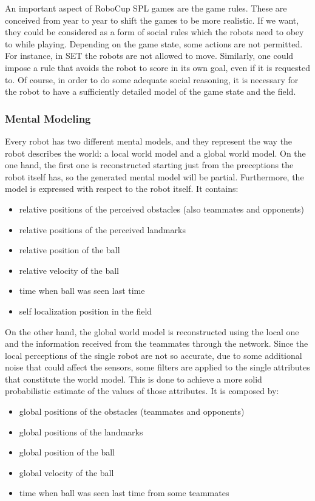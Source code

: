 \documentclass[a4paper, onecolumn, 12pt]{article}
\begin{document}
An important aspect of RoboCup SPL games are the game rules. These are conceived
from year to year to shift the games to be more realistic. If we want, they
could be considered as a form of social rules which the robots need to obey to
while playing. Depending on the game state, some actions are not permitted. For
instance, in SET the robots are not allowed to move. Similarly, one could impose
a rule that avoids the robot to score in its own goal, even if it is requested
to. Of course, in order to do some adequate social reasoning, it is necessary
for the robot to have a sufficiently detailed model of the game state and the
field.

\subsubsection{Mental Modeling}
\label{subsec:mental_model}
Every robot has two different mental models, and they represent the way the robot 
describes the world: a local world model and a global world model.
On the one hand, the first one is reconstructed starting just from the preceptions the robot itself has,
so the generated mental model will be partial. Furthermore, the model is expressed 
with respect to the robot itself.
It contains:
\begin{itemize}
    \item relative positions of the perceived obstacles (also teammates and opponents)
    \item relative positions of the perceived landmarks
    \item relative position of the ball
    \item relative velocity of the ball
    \item time when ball was seen last time
    \item self localization position in the field
\end{itemize}

On the other hand, the global world model is reconstructed using the local one and the information
received from the teammates through the network. Since the local perceptions of the 
single robot are not so accurate, due to some additional noise that could affect the sensors,
some filters are applied to the single attributes that constitute the world model. This 
is done to achieve a more solid probabilistic estimate of the values of those attributes.
It is composed by:
\begin{itemize}
    \item global positions of the obstacles (teammates and opponents)
    \item global positions of the landmarks
    \item global position of the ball
    \item global velocity of the ball
    \item time when ball was seen last time from some teammates
\end{itemize}
\end{document}
